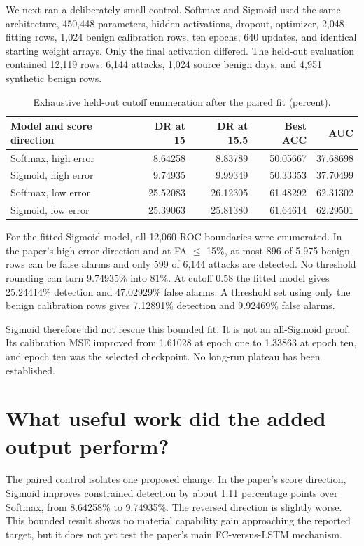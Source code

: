 \documentclass[11pt]{article}
\begin{document}
We next ran a deliberately small control. Softmax and Sigmoid used the same
architecture, 450,448 parameters, hidden activations, dropout, optimizer,
2,048 fitting rows, 1,024 benign calibration rows, ten epochs, 640 updates,
and identical starting weight arrays. Only the final activation differed. The
held-out evaluation contained 12,119 rows: 6,144 attacks, 1,024 source benign
days, and 4,951 synthetic benign rows.

\begin{table}[ht]
\centering
\caption{Exhaustive held-out cutoff enumeration after the paired fit (percent).}
\small
\begin{tabular}{L{0.31\textwidth}rrrr}
\toprule
Model and score direction & DR at 15 & DR at 15.5 & Best ACC & AUC \\
\midrule
Softmax, high error & 8.64258 & 8.83789 & 50.05667 & 37.68698 \\
Sigmoid, high error & 9.74935 & 9.99349 & 50.33353 & 37.70499 \\
Softmax, low error & 25.52083 & 26.12305 & 61.48292 & 62.31302 \\
Sigmoid, low error & 25.39063 & 25.81380 & 61.64614 & 62.29501 \\
\bottomrule
\end{tabular}
\end{table}

For the fitted Sigmoid model, all 12,060 ROC boundaries were enumerated. In the
paper's high-error direction and at FA $\leq$ 15\%, at most 896 of 5,975
benign rows can be false alarms and only 599 of 6,144 attacks are detected.
No threshold rounding can turn 9.74935\% into 81\%. At cutoff 0.58 the fitted
model gives 25.24414\% detection and 47.02929\% false alarms. A threshold set
using only the benign calibration rows gives 7.12891\% detection and 9.92469\%
false alarms.

Sigmoid therefore did not rescue this bounded fit. It is not an all-Sigmoid
proof. Its calibration MSE improved from 1.61028 at epoch one to 1.33863 at
epoch ten, and epoch ten was the selected checkpoint. No long-run plateau has
been established.

\section{What useful work did the added output perform?}

The paired control isolates one proposed change. In the paper's score direction,
Sigmoid improves constrained detection by about 1.11 percentage points over
Softmax, from 8.64258\% to 9.74935\%. The reversed direction is slightly worse.
This bounded result shows no material capability gain approaching the reported
target, but it does not yet test the paper's main FC-versus-LSTM mechanism.
\end{document}
